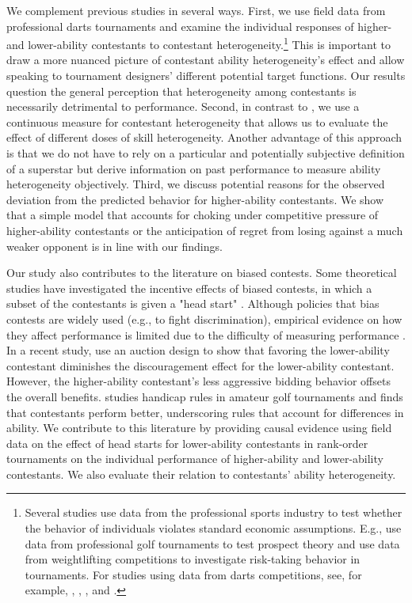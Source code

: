 \documentclass[11pt,a4paper]{article}
\begin{document}
We complement previous studies in several ways. First, we use field data from professional darts tournaments and examine the individual responses of higher- and lower-ability contestants to contestant heterogeneity.\footnote{Several studies use data from the professional sports industry to test whether the behavior of individuals violates standard economic assumptions. E.g.,  use data from professional golf tournaments to test prospect theory and  use data from weightlifting competitions to investigate risk-taking behavior in tournaments. For studies using data from darts competitions, see, for example, , , , and .} This is important to draw a more nuanced picture of contestant ability heterogeneity's effect and allow speaking to tournament designers' different potential target functions. Our results question the general perception that heterogeneity among contestants is necessarily detrimental to performance. Second, in contrast to , we use a continuous measure for contestant heterogeneity that allows us to evaluate the effect of different doses of skill heterogeneity. Another advantage of this approach is that we do not have to rely on a particular and potentially subjective definition of a superstar but derive information on past performance to measure ability heterogeneity objectively. Third, we discuss potential reasons for the observed deviation from the predicted behavior for higher-ability contestants. We show that a simple model that accounts for choking under competitive pressure of higher-ability contestants or the anticipation of regret from losing against a much weaker opponent is in line with our findings.\par 

Our study also contributes to the literature on biased contests. Some theoretical studies have investigated the incentive effects of biased contests, in which a subset of the contestants is given a "head start" \cite{kirkegaard.2012, Drugov.2017}. Although policies that bias contests are widely used (e.g., to fight discrimination), empirical evidence on how they affect performance is limited due to the difficulty of measuring performance \cite{Calsamiglia.2013, Leibbrandt.2018}. In a recent study,  use an auction design to show that favoring the lower-ability contestant diminishes the discouragement effect for the lower-ability contestant. However, the higher-ability contestant's less aggressive bidding behavior offsets the overall benefits.  studies handicap rules in amateur golf tournaments and finds that contestants perform better, underscoring rules that account for differences in ability. We contribute to this literature by providing causal evidence using field data on the effect of head starts for lower-ability contestants in rank-order tournaments on the individual performance of higher-ability and lower-ability contestants. We also evaluate their relation to contestants' ability heterogeneity.\par
\end{document}
